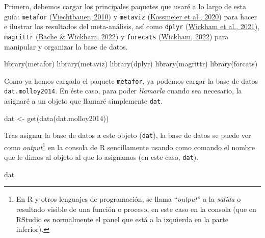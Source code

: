 \documentclass[
  bookmarksnumbered]{article}
\newenvironment{Shaded}{\begin{snugshade}}{\end{snugshade}}
\newcommand{\FunctionTok}[1]{\textcolor[rgb]{0.39,0.29,0.61}{#1}}
\newcommand{\NormalTok}[1]{\textcolor[rgb]{0.12,0.11,0.11}{#1}}
\newcommand{\OtherTok}[1]{\textcolor[rgb]{0.00,0.43,0.16}{#1}}
\begin{document}
Primero, debemos cargar los principales paquetes que usaré a lo largo de esta guía: \texttt{metafor} (\protect\hyperlink{ref-viechtbauer2010}{Viechtbauer, 2010}) y \texttt{metaviz} (\protect\hyperlink{ref-KossmeierMetaviz}{Kossmeier et al., 2020}) para hacer e ilustrar los resultados del meta-análisis, así como \texttt{dplyr} (\protect\hyperlink{ref-WickhamDplyr2021}{Wickham et al., 2021}), \texttt{magrittr} (\protect\hyperlink{ref-magrittrcite}{Bache \& Wickham, 2022}) y \texttt{forecats} (\protect\hyperlink{ref-Wickhamforcats2022}{Wickham, 2022}) para manipular y organizar la base de datos.

\begin{Shaded}
\begin{Highlighting}[]
\FunctionTok{library}\NormalTok{(metafor)}
\FunctionTok{library}\NormalTok{(metaviz)}
\FunctionTok{library}\NormalTok{(dplyr)}
\FunctionTok{library}\NormalTok{(magrittr)}
\FunctionTok{library}\NormalTok{(forcats)}
\end{Highlighting}
\end{Shaded}

Como ya hemos cargado el paquete \texttt{metafor}, ya podemos cargar la base de datos \texttt{dat.molloy2014}. En éste caso, para poder \emph{llamarla} cuando sea necesario, la asignaré a un objeto que llamaré simplemente \texttt{dat}.

\begin{Shaded}
\begin{Highlighting}[]
\NormalTok{dat }\OtherTok{\textless{}{-}} \FunctionTok{get}\NormalTok{(}\FunctionTok{data}\NormalTok{(dat.molloy2014))}
\end{Highlighting}
\end{Shaded}

Tras asignar la base de datos a este objeto (\texttt{dat}), la base de datos se puede ver como \emph{output}\footnote{En R y otros lenguajes de programación, se llama ``\emph{output}'' a la \emph{salida} o resultado visible de una función o proceso, en este caso en la consola (que en RStudio es normalmente el panel que está a la izquierda en la parte inferior).} en la consola de R sencillamente usando como comando el nombre que le dimos al objeto al que lo asignamos (en este caso, \texttt{dat}).

\begin{Shaded}
\begin{Highlighting}[]
\NormalTok{dat}
\end{Highlighting}
\end{Shaded}
\end{document}
